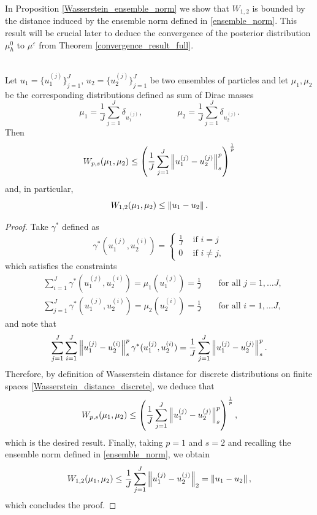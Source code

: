 \documentclass[10pt]{article}
\begin{document}
In Proposition \ref{Wasserstein_ensemble_norm} we show that $W_{1,2}$ is bounded by the distance induced by the ensemble norm defined in \ref{ensemble_norm}. This result will be crucial later to deduce the convergence of the posterior distribution $\mu_h^0$ to $\mu^{\varepsilon}$ from Theorem \ref{convergence_result_full}.

\begin{proposition}
\label{Wasserstein_ensemble_norm}
\leavevmode \\
Let $u_1 = \{ u_1^{(j)} \}_{j=1}^J$, $u_2 = \{ u_2^{(j)} \}_{j=1}^J$ be two ensembles of particles and let $\mu_1, \mu_2$ be the corresponding distributions defined as sum of Dirac masses
\begin{equation*}
\mu_1 = \frac{1}{J} \sum_{j=1}^J \delta_{u_1^{(j)}}, \qquad \qquad \mu_2 = \frac{1}{J} \sum_{j=1}^J \delta_{u_2^{(j)}}.
\end{equation*}
Then
\[ W_{p,s}(\mu_1, \mu_2) \le \left ( \frac{1}{J} \sum_{j=1}^J \left\|u_1^{(j)} - u_2^{(j)}\right\|_s^p \right )^{\frac{1}{p}} \]
and, in particular,
\[ W_{1,2}(\mu_1, \mu_2) \le \left\|u_1 - u_2\right\|. \]
\end{proposition}
\begin{proof}
Take $\gamma^*$ defined as
\begin{equation*}
\gamma^*(u_1^{(j)}, u_2^{(i)}) = 
\begin{cases}
\frac{1}{J} & \text{ if } i = j \\
0 & \text{ if } i \neq j,
\end{cases}
\end{equation*}
which satisfies the constraints
\begin{align*}
& \sum_{i=1}^{J} \gamma^*(u_1^{(j)}, u_2^{(i)}) = \mu_1(u_1^{(j)}) = \frac{1}{J} \qquad \text{for all } j = 1, \dots J, \\
& \sum_{j=1}^{J} \gamma^*(u_1^{(j)}, u_2^{(i)}) = \mu_2(u_2^{(i)}) = \frac{1}{J} \qquad \text{for all } i = 1, \dots J,
\end{align*}
and note that
\begin{equation*}
\sum_{j=1}^{J} \sum_{i=1}^{J} \left\|u_1^{(j)} - u_2^{(i)}\right\|_s^p \gamma^*(u_1^{(j)}, u_2^{(i)}) = \frac{1}{J} \sum_{j=1}^{J} \left\|u_1^{(j)} - u_2^{(j)}\right\|_s^p.
\end{equation*}
Therefore, by definition of Wasserstein distance for discrete distributions on finite spaces \eqref{Wasserstein_distance_discrete}, we deduce that
\[ W_{p,s}(\mu_1, \mu_2) \le \left ( \frac{1}{J} \sum_{j=1}^J \left\|u_1^{(j)} - u_2^{(j)}\right\|_s^p \right )^{\frac{1}{p}}, \]
which is the desired result. Finally, taking $p = 1$ and $s = 2$ and recalling the ensemble norm defined in \eqref{ensemble_norm}, we obtain
\[ W_{1,2}(\mu_1, \mu_2) \le \frac{1}{J} \sum_{j=1}^J \left\|u_1^{(j)} - u_2^{(j)}\right\|_2 = \left\|u_1 - u_2\right\|, \]
which concludes the proof.
\end{proof}
\end{document}
